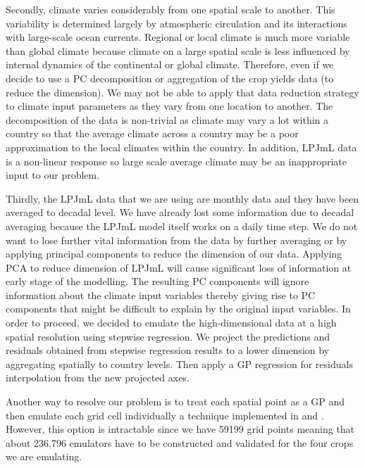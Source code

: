 Secondly, climate varies considerably from one spatial scale to another. This variability is determined largely by atmospheric circulation and its interactions with large-scale ocean currents. Regional or local climate is much more variable than global climate because climate on a large spatial scale is less influenced by internal dynamics of the continental or global climate. Therefore, even if we decide to use a PC decomposition or aggregation of the crop yields data (to reduce the dimension). We may not be able to apply that data reduction strategy to climate input parameters as they vary from one location to another. 
The decomposition of the data is non-trivial as climate may vary a lot within a  country so that the average climate across a country may be a poor approximation to the local climates within the country. In addition, LPJmL data is a non-linear response so large scale average climate may be an inappropriate input to our problem.

Thirdly, the LPJmL data that we are using are monthly data and they have been averaged to decadal level. We have already lost some information due to decadal averaging because the LPJmL model itself works on a daily time step. We do not want to lose further vital information from the data by further averaging or by applying principal components to reduce the dimension of our data. Applying PCA  to reduce dimension of LPJmL will cause significant loss of information at early stage of the modelling. The resulting PC components will ignore information about the climate input variables thereby giving rise to PC components that might be difficult to explain by the original input variables. In order to proceed, we decided to emulate the high-dimensional data at a high spatial resolution using stepwise regression. We project the predictions and residuals obtained from stepwise regression results to a lower dimension by aggregating spatially to country levels. Then apply a GP regression for residuals interpolation from the new projected axes.

Another way to resolve our problem is to treat each spatial point as a GP and then emulate each grid cell individually a technique implemented in \cite{q62} and \cite{q64}. However, this option is intractable since we have 59199 grid points meaning that about 236,796 emulators have to be constructed and validated for the four crops we are emulating.

